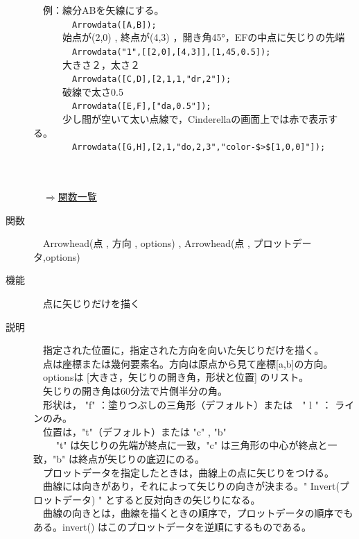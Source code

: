 \documentclass[papersize,a4paper,12pt,uplatex]{jsarticle}
\begin{document}
\begin{description}
　例：線分ABを矢線にする。\\
　　　　\verb|Arrowdata([A,B]);|\\
　　　始点が(2,0) , 終点が(4,3) ，開き角45°，EFの中点に矢じりの先端\\
　　　　\verb|Arrowdata("1",[[2,0],[4,3]],[1,45,0.5]);|\\
　　　大きさ２，太さ２\\
　　　　\verb|Arrowdata([C,D],[2,1,1,"dr,2"]);|\\
　　　破線で太さ0.5\\
　　　　\verb|Arrowdata([E,F],["da,0.5"]);|\\
　　　少し間が空いて太い点線で，Cinderellaの画面上では赤で表示する。\\
　　　　\verb|Arrowdata([G,H],[2,1,"do,2,3","color-$>$[1,0,0]"]);| \\

　　　\\
\\

\begin{flushright}　\hyperlink{functionlist}{$\Rightarrow$関数一覧}\end{flushright}

\hypertarget{arrowhead}{}
\item[関数]　Arrowhead(点 , 方向 , options) , Arrowhead(点 , プロットデータ,options)
\item[機能]　点に矢じりだけを描く
\item[説明]　指定された位置に，指定された方向を向いた矢じりだけを描く。\\
　点は座標または幾何要素名。方向は原点から見て座標[a,b]の方向。\\
　optionsは [大きさ，矢じりの開き角，形状と位置] のリスト。\\
　矢じりの開き角は60分法で片側半分の角。\\
　形状は， "f" ：塗りつぶしの三角形（デフォルト）または　" l " ： ラインのみ。\\ 
　位置は，"t"（デフォルト）または "c" , "b"\\
　　 "t" は矢じりの先端が終点に一致，"c" は三角形の中心が終点と一致，"b" は終点が矢じりの底辺にのる。\\
　プロットデータを指定したときは，曲線上の点に矢じりをつける。\\
　曲線には向きがあり，それによって矢じりの向きが決まる。" Invert(プロットデータ) " とすると反対向きの矢じりになる。\\
　曲線の向きとは，曲線を描くときの順序で，プロットデータの順序でもある。invert() はこのプロットデータを逆順にするものである。\\


\end{description}
\end{document}
